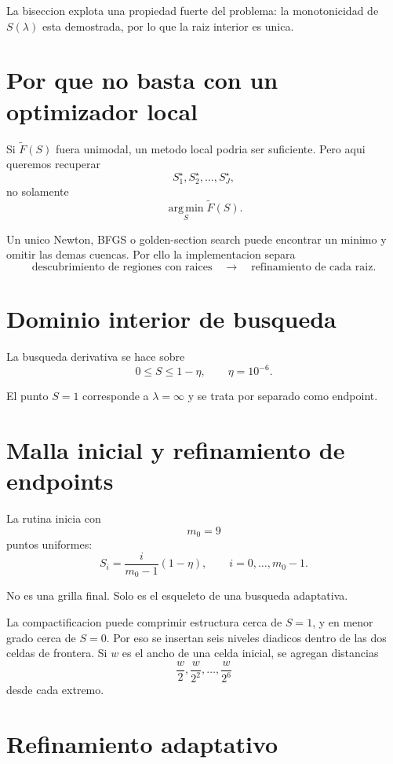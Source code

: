 \documentclass[11pt]{article}
\newcommand{\argmin}{\operatorname*{arg\,min}}
\begin{document}
La biseccion explota una propiedad fuerte del problema: la monotonicidad de
\(S(\lambda)\) esta demostrada, por lo que la raiz interior es unica.

\section{Por que no basta con un optimizador local}

Si \(\widetilde F(S)\) fuera unimodal, un metodo local podria ser suficiente.
Pero aqui queremos recuperar
\[
S_1^\star,
S_2^\star,
\ldots,
S_J^\star,
\]
no solamente
\[
\argmin_S \widetilde F(S).
\]

Un unico Newton, BFGS o golden-section search puede encontrar un minimo y
omitir las demas cuencas. Por ello la implementacion separa
\[
\text{descubrimiento de regiones con raices}
\quad\longrightarrow\quad
\text{refinamiento de cada raiz}.
\]

\section{Dominio interior de busqueda}

La busqueda derivativa se hace sobre
\begin{equation}
0\le S\le1-\eta,
\qquad
\eta=10^{-6}.
\label{eq:interior-domain}
\end{equation}

El punto \(S=1\) corresponde a \(\lambda=\infty\) y se trata por separado
como endpoint.

\section{Malla inicial y refinamiento de endpoints}

La rutina inicia con
\[
m_0=9
\]
puntos uniformes:
\[
S_i
=
\frac{i}{m_0-1}(1-\eta),
\qquad
i=0,\ldots,m_0-1.
\]

No es una grilla final. Solo es el esqueleto de una busqueda adaptativa.

La compactificacion puede comprimir estructura cerca de \(S=1\), y en menor
grado cerca de \(S=0\). Por eso se insertan seis niveles diadicos dentro de las
dos celdas de frontera. Si \(w\) es el ancho de una celda inicial, se agregan
distancias
\[
\frac{w}{2},
\frac{w}{2^2},
\ldots,
\frac{w}{2^6}
\]
desde cada extremo.

\section{Refinamiento adaptativo}
\end{document}
